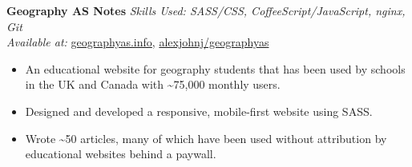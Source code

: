 \textbf{Geography AS Notes}  \newline
\textit{Skills Used: SASS/CSS, CoffeeScript/JavaScript, nginx, Git}\\
\textit{Available at:} \href{https://geographyas.info}{geographyas.info}, \href{https://github.com/\myweb/geographyas}{alexjohnj/geographyas}
\begin{itemize}[leftmargin=0mm]
\item An educational website for geography students that has been used by
  schools in the UK and Canada with \textasciitilde{}75,000 monthly users.
\item Designed and developed a responsive, mobile-first website using SASS.
\item Wrote \textasciitilde{}50 articles, many of which have been used without
  attribution by educational websites behind a paywall.
\end{itemize}

